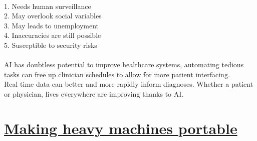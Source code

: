 \documentclass[12pt]{article}
\begin{document}
{    \\ 1.  Needs human surveillance
    \\ 2.  May overlook social variables
    \\ 3.  May leads to unemployment
    \\ 4.  Inaccuracies are still possible
    \\ 5.  Susceptible to security risks
    \\\\AI has doubtless potential to improve healthcare systems, automating tedious tasks can free up clinician schedules to allow for more patient interfacing.
    \\ Real time data can better and more rapidly inform diagnoses. Whether a patient or physician, lives everywhere are improving thanks to AI.}
	\section{\underline{Making heavy machines portable}}
\end{document}
